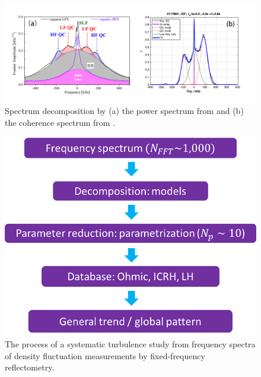 \begin{figure}[h]
\begin{centering}
\includegraphics[scale=0.52]{decomposition.png}
\par\end{centering}
\caption{Spectrum decomposition by (a) the power spectrum from \cite{Vershkov_2005_NF} and (b) the coherence spectrum from \cite{Kramer-Flecken_2015_NJP}.}
\label{fig:decomposition}
\end{figure}



\begin{figure}[h]
\begin{centering}
\includegraphics[scale=0.65]{objective.png}
\par\end{centering}
\caption{The process of a systematic turbulence study from frequency spectra of density fluctuation measurements by fixed-frequency reflectometry.}
\label{fig:objective}
\end{figure}



